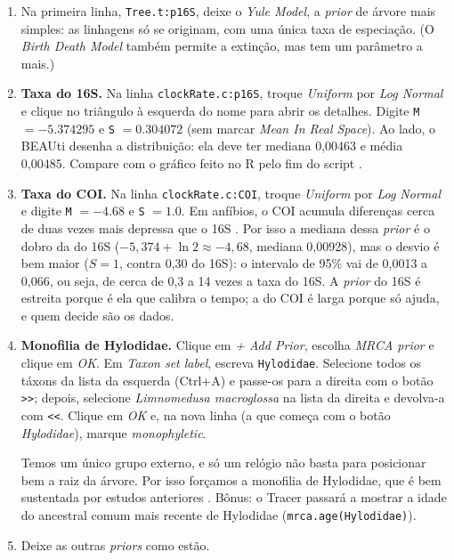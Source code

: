 \documentclass[11pt,a4paper]{article}
\newcommand{\arq}[1]{\path{#1}}
\newcommand{\ui}[1]{\textit{#1}}
\newcommand{\tecla}[1]{\textsf{#1}}
\begin{document}
\begin{enumerate}
\item Na primeira linha, \verb|Tree.t:p16S|, deixe o \ui{Yule Model}, a \emph{prior} de árvore
mais simples: as linhagens só se originam, com uma única taxa de especiação. (O \ui{Birth Death
Model} também permite a extinção, mas tem um parâmetro a mais.)

\item \textbf{Taxa do 16S.} Na linha \verb|clockRate.c:p16S|, troque \ui{Uniform} por
\ui{Log Normal} e clique no triângulo à esquerda do nome para abrir os detalhes. Digite
\verb|M| $= -5.374295$ e \verb|S| $= 0.304072$ (sem marcar \ui{Mean In Real Space}). Ao lado,
o BEAUti desenha a distribuição: ela deve ter mediana 0,00463 e média 0,00485. Compare com o
gráfico feito no R pelo fim do script \arq{ajuste_taxa.R}.

\item \textbf{Taxa do COI.} Na linha \verb|clockRate.c:COI|, troque \ui{Uniform} por
\ui{Log Normal} e digite \verb|M| $= -4.68$ e \verb|S| $= 1.0$. Em anfíbios, o COI acumula
diferenças cerca de duas vezes mais depressa que o 16S \cite{vences2005b}. Por isso a mediana
dessa \emph{prior} é o dobro da do 16S ($-5{,}374 + \ln 2 \approx -4{,}68$, mediana 0,00928),
mas o desvio é bem maior ($S = 1$, contra 0,30 do 16S): o intervalo de 95\% vai de 0,0013 a
0,066, ou seja, de cerca de 0,3 a 14 vezes a taxa do 16S. A \emph{prior} do 16S é estreita
porque é ela que calibra o tempo; a do COI é larga porque só ajuda, e quem decide são os dados.

\item \textbf{Monofilia de Hylodidae.} Clique em \ui{+ Add Prior}, escolha \ui{MRCA prior} e
clique em \ui{OK}. Em \ui{Taxon set label}, escreva \verb|Hylodidae|. Selecione todos os táxons
da lista da esquerda (\tecla{Ctrl+A}) e passe-os para a direita com o botão \texttt{>>}; depois, selecione
\emph{Limnomedusa macroglossa} na lista da direita e devolva-a com \texttt{<<}. Clique em \ui{OK}
e, na nova linha (a que começa com o botão \ui{Hylodidae}), marque \ui{monophyletic}.

Temos um único grupo externo, e só um relógio não basta para posicionar bem a raiz da árvore.
Por isso forçamos a monofilia de Hylodidae, que é bem sustentada por estudos anteriores
\cite{vittorazzi2021,desa2022}. Bônus: o Tracer passará a mostrar a idade do ancestral comum
mais recente de Hylodidae (\verb|mrca.age(Hylodidae)|).

\item Deixe as outras \emph{priors} como estão.
\end{enumerate}
\end{document}
